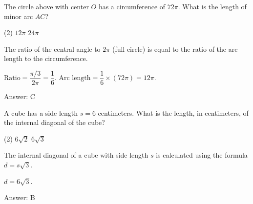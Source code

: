 \documentclass[11pt,paper=a4,answers]{exam}
\begin{document}
\begin{questions}
\vspace{1cm}

\question
\begin{center}
\end{center}
The circle above with center $O$ has a circumference of $72\pi$. What is the length of minor arc $AC$?
\begin{tasks}(2)
    \task $12\pi$
    \task $24\pi$
\end{tasks}

\begin{solution}
The ratio of the central angle to $2\pi$ (full circle) is equal to the ratio of the arc length to the circumference.
\vspace{5pt}
\begin{center}
$\text{Ratio} = \dfrac{\pi/3}{2\pi} = \dfrac{1}{6}$.
\vspace{5pt}
$\text{Arc length} = \dfrac{1}{6} \times (72\pi) = 12\pi$.
\end{center}
\vspace{5pt}
Answer: \colorbox{yellow!100}{C}
\end{solution}

\vspace{1cm}

\question
A cube has a side length $s = 6$ centimeters. What is the length, in centimeters, of the internal diagonal of the cube?
\begin{tasks}(2)
    \task $6\sqrt{2}$
    \task $6\sqrt{3}$
\end{tasks}

\begin{solution}
The internal diagonal of a cube with side length $s$ is calculated using the formula $d = s\sqrt{3}$.
\vspace{5pt}
\begin{center}
$d = 6\sqrt{3}$.
\end{center}
\vspace{5pt}
Answer: \colorbox{yellow!100}{B}
\end{solution}



\end{questions}
\end{document}
